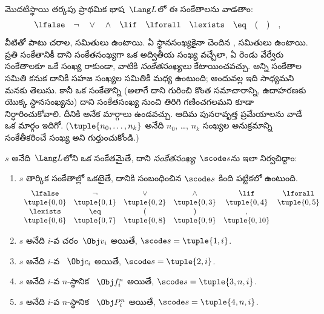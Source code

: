 \documentclass[../../../include/open-logic-section]{subfiles}
\begin{document}

మొదటిస్థాయి తర్కపు ప్రాథమిక భాష~$\Lang L$లో ఈ సంకేతాలను వాడతాం:
\[
\lfalse \quad \lnot \quad \lor \quad \land \quad \lif \quad \lforall
\quad \lexists \quad \eq \quad ( \quad ) \quad ,
\]
వీటితో పాటు చరాల, 
 సమితులు ఉంటాయి. ఏ స్థానసంఖ్యకైనా చెందిన
, 
 సమితులు ఉంటాయి. ప్రతి సంకేతానికీ దాని
సంకేతసంఖ్యగా ఒక అద్వితీయ సంఖ్య వచ్చేలా, ఏ రెండు వేర్వేరు సంకేతాలకూ ఒకే
సంఖ్య రాకుండా, వాటికి \emph{సంకేతసంఖ్యలు} కేటాయించవచ్చు. అన్ని సంకేతాల
సమితి  కనుక దానికీ సహజ సంఖ్యల
సమితికీ మధ్య  ఉంటుంది; అందువల్ల
ఇది సాధ్యమని మనకు తెలుసు. కానీ ఒక సంకేతాన్ని (అలాగే దాని గురించి కొంత
సమాచారాన్ని, ఉదాహరణకు  యొక్క
స్థానసంఖ్యను) దాని సంకేతసంఖ్య నుంచి తిరిగి గణించగలమని కూడా
నిర్ధారించుకోవాలి. దీనికి అనేక మార్గాలు ఉండవచ్చు. ఆదిమ పునరావృత్త ప్రమేయాలను
వాడే ఒక మార్గం ఇదిగో. ($\tuple{n_0, \dots, n_k}$ అనేది $n_0$, \dots,
$n_k$ సంఖ్యల అనుక్రమాన్ని సంకేతీకరించే సంఖ్య అని గుర్తుంచుకోండి.)

\begin{defn}
$s$ అనేది~$\Lang L$లోని ఒక సంకేతమైతే, దాని \emph{సంకేతసంఖ్య}~$\scode s$ను
ఇలా నిర్వచిద్దాం:
\begin{enumerate}
\item $s$ తార్కిక సంకేతాల్లో ఒకటైతే, దానికి సంబంధించిన $\scode s$ కింది పట్టికలో ఉంటుంది.
\[
\begin{array}{cccccccccc}
  \lfalse & \lnot & \lor & \land & \lif & \lforall \\
\tuple{0, 0} & \tuple{0, 1} & \tuple{0, 2} & \tuple{0, 3} &
\tuple{0, 4} & \tuple{0, 5} \\
\lexists & \eq & ( & ) & ,\\
\tuple{0, 6} & \tuple{0, 7} &
\tuple{0, 8} & \tuple{0, 9} & \tuple{0, 10}
\end{array}
\]
\item $s$ అనేది $i$-వ చరం~$\Obj v_i$ అయితే, $\scode s = \tuple{1, i}$.
\item $s$ అనేది $i$-వ ~$\Obj c_i$ అయితే,
  $\scode s = \tuple{2, i}$.
\item $s$ అనేది $i$-వ $n$-స్థానిక 
  ~$\Obj f_i^n$ అయితే, $\scode s = \tuple{3, n, i}$.
\item $s$ అనేది $i$-వ $n$-స్థానిక 
  ~$\Obj P_i^n$ అయితే, $\scode s = \tuple{4, n, i}$.
\end{enumerate}
\end{defn}
\end{document}
